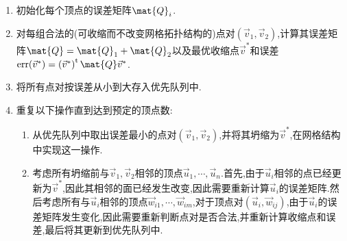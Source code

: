 \documentclass{ctexart}
\begin{document}
\begin{enumerate}[label=\tbf{\arabic*.},topsep=0pt,parsep=0pt,itemsep=0pt,partopsep=0pt]
    \item 初始化每个顶点的误差矩阵$\mat{Q}_i$.
    \item 对每组合法的(可收缩而不改变网格拓扑结构的)点对$(\vec{v}_1,\vec{v}_2)$,计算其误差矩阵$\mat{Q}=\mat{Q}_1+\mat{Q}_2$以及最优收缩点$\vec{v}^\ast$和误差$\text{err}(\vec{v}^\ast)=\left(\vec{v}^\ast\right)^{\text{t}}\mat{Q}\vec{v}^\ast$.
    \item 将所有点对按误差从小到大存入优先队列中.
    \item 重复以下操作直到达到预定的顶点数:
    \begin{enumerate}[label=\tbf{\alph*.},topsep=0pt,parsep=0pt,itemsep=0pt,partopsep=0pt]
        \item 从优先队列中取出误差最小的点对$(\vec{v}_1,\vec{v}_2)$,并将其坍缩为$\vec{v}^\ast$,在网格结构中实现这一操作.
        \item 考虑所有坍缩前与$\vec{v}_1,\vec{v}_2$相邻的顶点$\vec{u}_1,\cdots,\vec{u}_n$.首先,由于$\vec{u}_i$相邻的点已经更新为$\vec{v}^\ast$,因此其相邻的面已经发生改变,因此需要重新计算$\vec{u}_i$的误差矩阵.然后考虑所有与$\vec{u}_i$相邻的顶点$\vec{w}_{i1},\cdots,\vec{w}_{im}$,对于顶点对$\left(\vec{u}_i,\vec{w}_{ij}\right)$,由于$\vec{u}_i$的误差矩阵发生变化,因此需要重新判断点对是否合法,并重新计算收缩点和误差,最后将其更新到优先队列中.
    \end{enumerate}
\end{enumerate}
\end{document}
